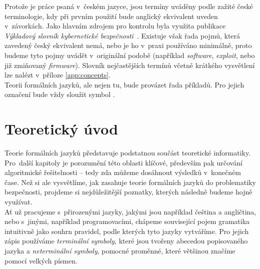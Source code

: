Protože je práce psaná v~českém jazyce, jsou termíny uváděny podle zažité české terminologie, kdy při prvním použití bude anglický ekvivalent uveden 
v~závorkách. Jako hlavním zdrojem pro kontrolu byla využita publikace \textit{Výkladový slovník kybernetické bezpečnosti}~\cite{Slovnik2015}. 
Existuje však řada pojmů, která zavedený český ekvivalent nemá, nebo je ho v~praxi používáno minimálně, proto budeme tyto pojmy uvádět v~originální 
podobě (například \textit{software}, \textit{exploit}, nebo již zmiňovaný \textit{firmware}). Slovník nejčastějších termínů včetně krátkého
vysvětlení lze nalézt v~příloze \ref{app:concepts}. \\

Teorii formálních jazyků, ale nejen tu, bude provázet řada příkladů. Pro jejich označení bude vždy sloužit symbol \Bat.

\chapter{Teoretický úvod} \label{ch:theory}
Teorie formálních jazyků představuje podstatnou součást teoretické informatiky. Pro~další kapitoly je porozumění této oblasti klíčové, především pak 
určování algoritmické řešitelnosti -- tedy zda můžeme dosáhnout výsledků v~konečném čase. Než si ale vysvětlíme, jak zasahuje teorie formálních 
jazyků do problematiky bezpečnosti, projdeme si nejdůležitější poznatky, kterých následně budeme hojně využívat. \\

Ať už pracujeme s~přirozenými jazyky, jakými jsou například čeština a angličtina, nebo s~jinými, například programovacími, chápeme související pojem 
gramatika intuitivně jako souhrn pravidel, podle kterých tyto jazyky vytváříme. Pro jejich zápis používáme \textit{terminální symboly}, které jsou 
tvořeny abecedou popisovaného jazyka a \textit{neterminální symboly}, pomocné proměnné, které většinou značíme pomocí velkých písmen. \\


